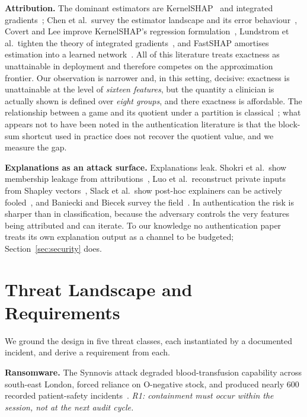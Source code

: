 \documentclass[conference]{IEEEtran}
\begin{document}
\textbf{Attribution.} The dominant estimators are KernelSHAP~\cite{lundberg2017}
and integrated gradients~\cite{sundararajan2017}; Chen et al.\ survey the
estimator landscape and its error behaviour~\cite{chen2023}, Covert and Lee
improve KernelSHAP's regression formulation~\cite{covert2021}, Lundstrom et al.\
tighten the theory of integrated gradients~\cite{lundstrom2022}, and FastSHAP
amortises estimation into a learned network~\cite{jethani2022}. All of this
literature treats exactness as unattainable in deployment and therefore
competes on the approximation frontier. Our observation is narrower and, in
this setting, decisive: exactness is unattainable at the level of \emph{sixteen
features}, but the quantity a clinician is actually shown is defined over
\emph{eight groups}, and there exactness is affordable. The relationship between
a game and its quotient under a partition is classical~\cite{owen1977,shapley1953};
what appears not to have been noted in the authentication literature is that
the block-sum shortcut used in practice does not recover the quotient value,
and we measure the gap.

\textbf{Explanations as an attack surface.} Explanations leak. Shokri et al.\
show membership leakage from attributions~\cite{shokri2021}, Luo et al.\
reconstruct private inputs from Shapley vectors~\cite{luo2022}, Slack et al.\
show post-hoc explainers can be actively fooled~\cite{slack2020}, and Baniecki
and Biecek survey the field~\cite{baniecki2024,nguyen2024}. In authentication
the risk is sharper than in classification, because the adversary controls the
very features being attributed and can iterate. To our knowledge no
authentication paper treats its own explanation output as a channel to be
budgeted; Section~\ref{sec:security} does.

\section{Threat Landscape and Requirements}
\label{sec:threat}

We ground the design in five threat classes, each instantiated by a documented
incident, and derive a requirement from each.

\textbf{Ransomware.} The Synnovis attack degraded blood-transfusion capability
across south-east London, forced reliance on O-negative stock, and produced
nearly 600 recorded patient-safety incidents~\cite{nhssynnovis}. \emph{R1:
containment must occur within the session, not at the next audit cycle.}
\end{document}
